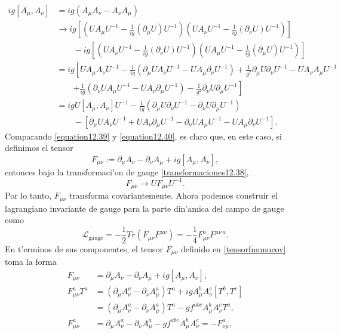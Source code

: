 \begin{equation} \label{equation12.40}
\begin{aligned}
ig\left[A_\mu , A_\nu\right]&=ig(A_\mu A_\nu-A_\nu A_\mu) \\
&\rightarrow ig \left[ \left(UA_\mu U^{-1}-\frac{1}{ig}(\partial_\mu U)U^{-1}\right)\left(UA_\nu U^{-1}-\frac{1}{ig}(\partial_\nu U)U^{-1}\right)\right] \\
& \qquad -ig\left[\left(UA_\nu U^{-1}-\frac{1}{ig}(\partial_\nu U)U^{-1}\right) \left(UA_\mu U^{-1}-\frac{1}{ig}(\partial_\mu U)U^{-1}\right)\right] \\
&=ig\left[ UA_\mu A_\nu U^{-1}-\frac{1}{ig}(\partial_\mu U A_\nu U^{-1}-UA_\mu \partial_\nu U^{-1})+\frac{1}{g^2}\partial_\mu U \partial_\nu U^{-1}-UA_\nu A_\mu U^{-1}\right. \\
& \qquad  \left. +\frac{1}{ig}(\partial_\nu U A_\mu U^{-1}-UA_\nu\partial_\mu U^{-1})-\frac{1}{g^2}\partial_\nu U \partial_\mu U^{-1}\right] \\
&=igU[A_\mu , A_\nu]U^{-1}-\frac{1}{ig}(\partial_\mu U \partial_\nu U^{-1}-\partial_\nu U \partial_\mu U^{-1})\\
& \qquad-[\partial_\mu U A_\nu U^{-1}+UA_\nu \partial_\mu U^{-1}-\partial_\nu U A_\mu U^{-1}-UA_\mu \partial_\nu U^{-1}].
\end{aligned}
\end{equation}
Comparando \eqref{equation12.39} y \eqref{equation12.40}, es claro que, en este caso, si definimos el tensor 
\begin{equation}\label{tensorfmunucov}
F_{\mu\nu}:=\partial_\mu A_\nu-\partial_\nu A_\mu+ig[A_\mu , A_\nu],
\end{equation}
entonces bajo la transformaci'on de gauge \eqref{transformaciones12.38},
\begin{equation} \label{eq1242}
F_{\mu\nu}\rightarrow UF_{\mu\nu}U^{-1}.
\end{equation}
Por lo tanto, $F_{\mu\nu}$ transforma covariantemente. Ahora podemos construir el lagrangiano invariante de gauge para la parte din'amica del campo de gauge como
\begin{equation}
\mathcal{L}_{\text{gauge}}=-\frac{1}{2}Tr \left(F_{\mu\nu}F^{\mu\nu}\right)=-\frac{1}{4}F^a_{\mu\nu}F^{\mu\nu\,a}.
\end{equation}
En t'erminos de sus componentes, el tensor $F_{\mu\nu}$ definido en \eqref{tensorfmunucov} toma la forma
\begin{equation}
\begin{aligned}
F_{\mu\nu}&=\partial_\mu A_\nu-\partial_\nu A_\mu+ig[A_\mu , A_\nu], \\
F^a_{\mu\nu}T^a&=(\partial_\mu A^a_\nu-\partial_\nu A^a_\mu)T^a+igA^b_\mu A^c_\nu[T^b , T^c] \\
&=(\partial_\mu A^a_\nu-\partial_\nu A^a_\mu)T^a-gf^{abc}A^b_{\mu}A^c_\nu T^a, \\
F^a_{\mu\nu}&=\partial_\mu A^a_\nu-\partial_\nu A^a_\mu -gf^{abc}A^b_{\mu}A^c_\nu =-F^a_{\nu\mu},
\end{aligned}
\end{equation}
